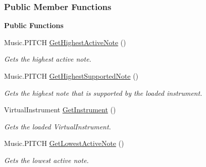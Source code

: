 \subsubsection*{Public Member Functions}
\begin{Indent}\textbf{ Public Functions}\par
\begin{DoxyCompactItemize}
\item 
\mbox{\label{group___virtual_instrument_manager_ab58eabfbcdaa60a3a7dbd972df6f57a6}} 
Music.\+P\+I\+T\+CH \hyperlink{group___virtual_instrument_manager_ab58eabfbcdaa60a3a7dbd972df6f57a6}{Get\+Highest\+Active\+Note} ()
\begin{DoxyCompactList}\small\item\em Gets the highest active note. \end{DoxyCompactList}\item 
\mbox{\label{group___virtual_instrument_manager_a586d5ed5b0fe832d66c9a99aa160ceee}} 
Music.\+P\+I\+T\+CH \hyperlink{group___virtual_instrument_manager_a586d5ed5b0fe832d66c9a99aa160ceee}{Get\+Highest\+Supported\+Note} ()
\begin{DoxyCompactList}\small\item\em Gets the highest note that is supported by the loaded instrument. \end{DoxyCompactList}\item 
\mbox{\label{group___virtual_instrument_manager_ac39a3e411417dc010f0e4fd8f146fbc3}} 
Virtual\+Instrument \hyperlink{group___virtual_instrument_manager_ac39a3e411417dc010f0e4fd8f146fbc3}{Get\+Instrument} ()
\begin{DoxyCompactList}\small\item\em Gets the loaded Virtual\+Instrument. \end{DoxyCompactList}\item 
\mbox{\label{group___virtual_instrument_manager_a09bfbd0756fc8110c877e5b59c104bcd}} 
Music.\+P\+I\+T\+CH \hyperlink{group___virtual_instrument_manager_a09bfbd0756fc8110c877e5b59c104bcd}{Get\+Lowest\+Active\+Note} ()
\begin{DoxyCompactList}\small\item\em Gets the lowest active note. \end{DoxyCompactList}\item 

\end{DoxyCompactItemize}
\end{Indent}
